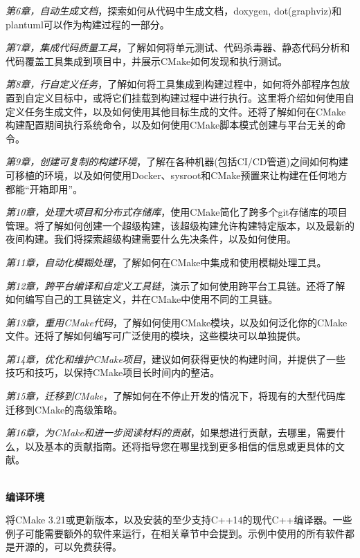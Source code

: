 \textit{第6章，自动生成文档}，探索如何从代码中生成文档，doxygen, dot(graphviz)和plantuml可以作为构建过程的一部分。

\textit{第7章，集成代码质量工具}，了解如何将单元测试、代码杀毒器、静态代码分析和代码覆盖工具集成到项目中，并展示CMake如何发现和执行测试。

\textit{第8章，行自定义任务}，了解如何将工具集成到构建过程中，如何将外部程序包放置到自定义目标中，或将它们挂载到构建过程中进行执行。这里将介绍如何使用自定义任务生成文件，以及如何使用其他目标生成的文件。还将了解如何在CMake构建配置期间执行系统命令，以及如何使用CMake脚本模式创建与平台无关的命令。

\textit{第9章，创建可复制的构建环境}，了解在各种机器(包括CI/CD管道)之间如何构建可移植的环境，以及如何使用Docker、sysroot和CMake预置来让构建在任何地方都能“开箱即用”。

\textit{第10章，处理大项目和分布式存储库}，使用CMake简化了跨多个git存储库的项目管理。将了解如何创建一个超级构建，该超级构建允许构建特定版本，以及最新的夜间构建。我们将探索超级构建需要什么先决条件，以及如何使用。

\textit{第11章，自动化模糊处理}，了解如何在CMake中集成和使用模糊处理工具。

\textit{第12章，跨平台编译和自定义工具链}，演示了如何使用跨平台工具链。还将了解如何编写自己的工具链定义，并在CMake中使用不同的工具链。

\textit{第13章，重用CMake代码}，了解如何使用CMake模块，以及如何泛化你的CMake文件。还将了解如何编写可广泛使用的模块，这些模块可以单独提供。

\textit{第14章，优化和维护CMake项目}，建议如何获得更快的构建时间，并提供了一些技巧和技巧，以保持CMake项目长时间内的整洁。 

\textit{第15章，迁移到CMake}，了解如何在不停止开发的情况下，将现有的大型代码库迁移到CMake的高级策略。

\textit{第16章，为CMake和进一步阅读材料的贡献}，如果想进行贡献，去哪里，需要什么，以及基本的贡献指南。还将指导您在哪里找到更多相信的信息或更具体的文献。

\hspace*{\fill} \\ %
\textbf{编译环境}

将CMake 3.21或更新版本，以及安装的至少支持C++14的现代C++编译器。一些例子可能需要额外的软件来运行，在相关章节中会提到。示例中使用的所有软件都是开源的，可以免费获得。

